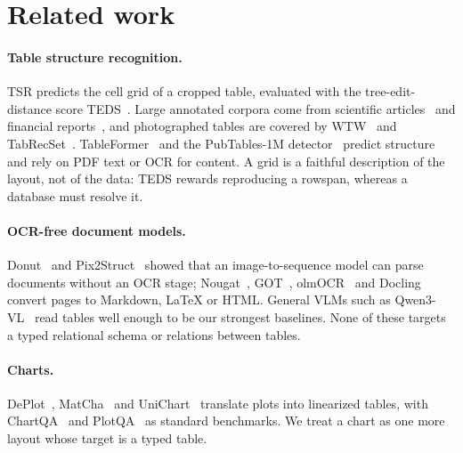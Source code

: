 \documentclass[10pt,twocolumn]{article}
\begin{document}
\section{Related work}
\label{sec:related}

\paragraph{Table structure recognition.} TSR predicts the cell grid of a cropped table, evaluated with the
tree-edit-distance score TEDS~\citep{zhong2020pubtabnet}. Large annotated corpora come from scientific
articles~\citep{zhong2020pubtabnet,smock2022pubtables,chi2019scitsr} and financial reports~\citep{zheng2021gte},
and photographed tables are covered by WTW~\citep{long2021wtw} and TabRecSet~\citep{yang2023tabrecset}.
TableFormer~\citep{nassar2022tableformer} and the PubTables-1M detector~\citep{smock2022pubtables} predict
structure and rely on PDF text or OCR for content. A grid is a faithful description of the layout, not of the data:
TEDS rewards reproducing a rowspan, whereas a database must resolve it.

\paragraph{OCR-free document models.} Donut~\citep{kim2022donut} and Pix2Struct~\citep{lee2023pix2struct}
showed that an image-to-sequence model can parse documents without an OCR stage; Nougat~\citep{blecher2023nougat},
GOT~\citep{wei2024got}, olmOCR~\citep{poznanski2025olmocr} and Docling~\citep{auer2024docling} convert pages to
Markdown, LaTeX or HTML. General VLMs such as Qwen3-VL~\citep{bai2025qwen3vl} read tables well enough to be our
strongest baselines. None of these targets a typed relational schema or relations between tables.

\paragraph{Charts.} DePlot~\citep{liu2023deplot}, MatCha~\citep{liu2023matcha} and UniChart~\citep{masry2023unichart}
translate plots into linearized tables, with ChartQA~\citep{masry2022chartqa} and PlotQA~\citep{methani2020plotqa}
as standard benchmarks. We treat a chart as one more layout whose target is a typed table.
\end{document}
